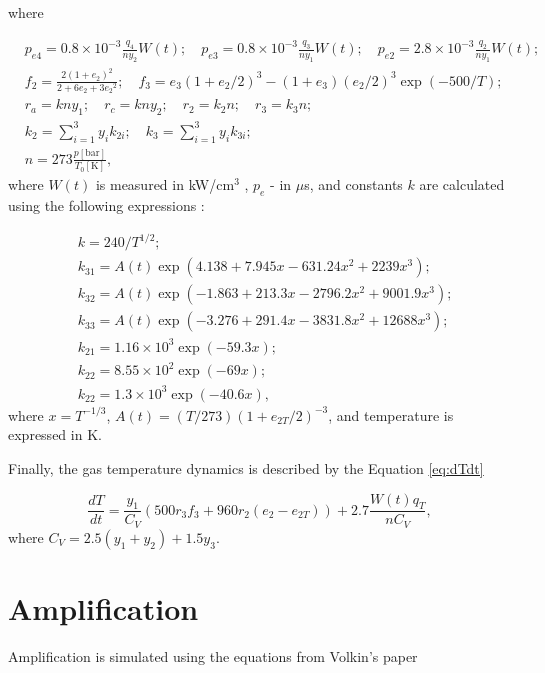 \documentclass{report}
\begin{document}
where

\begin{align*}
&p_{e4} = 0.8\times 10^{-3} \frac{q_4}{n y_2} W(t);\quad p_{e3} = 0.8\times 10^{-3}\frac{q_3}{n y_1} W(t);\quad p_{e2} = 2.8\times 10^{-3}\frac{q_2}{n y_1} W(t);\\
&f_2 = \frac{2(1+e_2)^2}{2+6e_2+3{e_2}^2};\quad f_3 = e_3(1+e_2/2)^3 - (1+e_3)(e_2/2)^3 \exp(- 500/T);\\
&r_a = kny_1;\quad r_c = kny_2;\quad r_2 = k_2n;\quad r_3 = k_3n;\\
&k_2 = \sum\limits_{i=1}^3 y_i k_{2i};\quad k_3 = \sum\limits_{i=1}^3 y_i k_{3i};\\
&n = 273 \frac{p[\text{bar}]}{T_0[\text{K}]},
\end{align*}
where $W(t)$ is measured in {kW/cm$^3$} , $p_e$ - in {$\mu$s}, and constants $k$ are calculated using the following expressions \cite{Biryukov-1974,Taylor-1969}:

\begin{align*}
&k = 240 / T^{1/2};\\
&k_{31} = A(t)\exp(4.138 + 7.945x - 631.24x^2 + 2239x^3);\\
&k_{32} = A(t)\exp(-1.863 + 213.3x - 2796.2x^2 + 9001.9x^3);\\
&k_{33} = A(t)\exp(-3.276 + 291.4x - 3831.8x^2 + 12688x^3);\\
&k_{21} = 1.16 \times 10^3 \exp(-59.3x);\\
&k_{22} = 8.55 \times 10^2 \exp(-69x);\\
&k_{22} = 1.3 \times 10^3 \exp(-40.6x),
\end{align*}
where $x=T^{-1/3}$, $A(t)=(T/273)(1+e_{2T}/2)^{-3}$, and temperature is expressed in K.


Finally, the gas temperature dynamics is described by the Equation \ref{eq:dTdt}

\begin{equation}\label{eq:dTdt}
\frac{dT}{dt} = \frac{y_1}{C_V}(500r_3f_3 + 960r_2(e_2-e_{2T})) + 2.7\frac{W(t)q_T}{nC_V},
\end{equation}
where $C_V = 2.5(y_1+y_2) + 1.5y_3$.


\section{Amplification}

Amplification is simulated using the equations from Volkin’s paper \cite{Volkin-1979}
\end{document}
